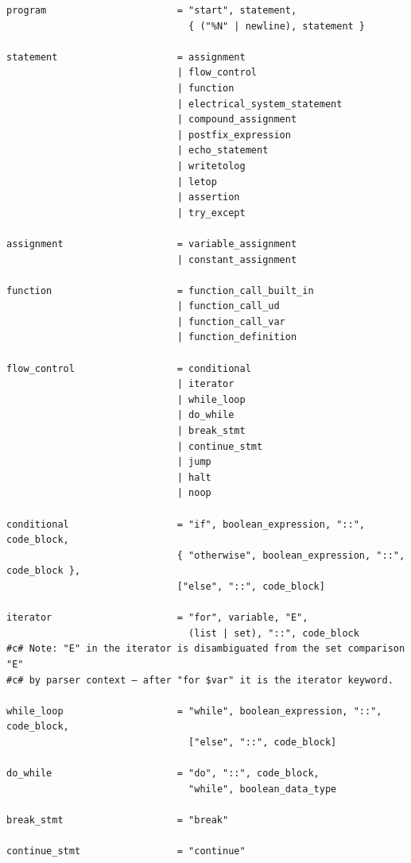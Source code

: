 \begin{verbatim}
program                       = "start", statement,
                                { ("%N" | newline), statement }

statement                     = assignment
                              | flow_control
                              | function
                              | electrical_system_statement
                              | compound_assignment
                              | postfix_expression
                              | echo_statement
                              | writetolog
                              | letop
                              | assertion
                              | try_except

assignment                    = variable_assignment          
                              | constant_assignment

function                      = function_call_built_in
                              | function_call_ud
                              | function_call_var
                              | function_definition

flow_control                  = conditional
                              | iterator
                              | while_loop
                              | do_while
                              | break_stmt
                              | continue_stmt
                              | jump
                              | halt
                              | noop

conditional                   = "if", boolean_expression, "::", code_block,
                              { "otherwise", boolean_expression, "::", code_block },
                              ["else", "::", code_block]

iterator                      = "for", variable, "E",
                                (list | set), "::", code_block
#c# Note: "E" in the iterator is disambiguated from the set comparison "E"
#c# by parser context — after "for $var" it is the iterator keyword.

while_loop                    = "while", boolean_expression, "::", code_block,
                                ["else", "::", code_block]

do_while                      = "do", "::", code_block,
                                "while", boolean_data_type

break_stmt                    = "break"

continue_stmt                 = "continue"


\end{verbatim}
